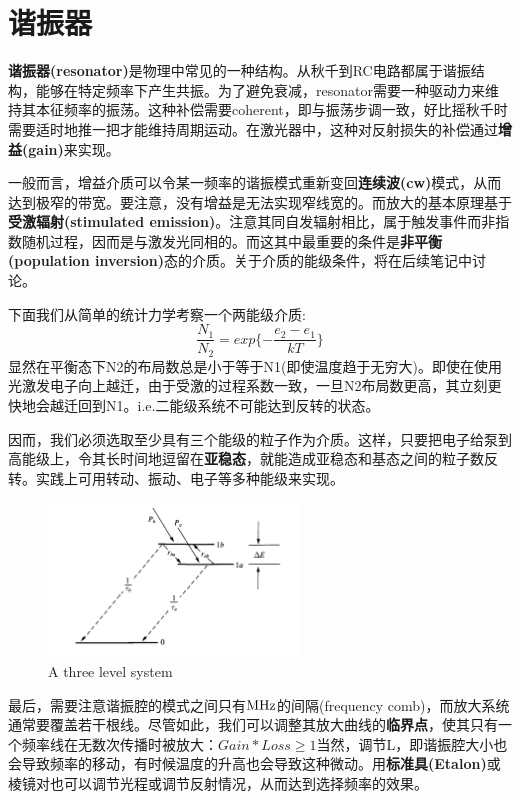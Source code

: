 \documentclass[12pt]{ctexart}%
\begin{document}
\section*{谐振器}
\textbf{谐振器(resonator)}是物理中常见的一种结构。从秋千到RC电路都属于谐振结构，能够在特定频率下产生共振。为了避免衰减，resonator需要一种驱动力来维持其本征频率的振荡。这种补偿需要coherent，即与振荡步调一致，好比摇秋千时需要适时地推一把才能维持周期运动。在激光器中，这种对反射损失的补偿通过\textbf{增益(gain)}来实现。
\par 一般而言，增益介质可以令某一频率的谐振模式重新变回\textbf{连续波(cw)}模式，从而达到极窄的带宽。要注意，没有增益是无法实现窄线宽的。而放大的基本原理基于\textbf{受激辐射(stimulated emission)}。注意其同自发辐射相比，属于触发事件而非指数随机过程，因而是与激发光同相的。而这其中最重要的条件是\textbf{非平衡(population inversion)}态的介质。关于介质的能级条件，将在后续笔记中讨论。
\par 下面我们从简单的统计力学考察一个两能级介质:
\begin{equation}
    \frac{N_1}{N_2}=exp\{-\frac{e_2-e_1}{kT}\}
\end{equation}
显然在平衡态下N2的布局数总是小于等于N1(即使温度趋于无穷大)。即使在使用光激发电子向上越迁，由于受激的过程系数一致，一旦N2布局数更高，其立刻更快地会越迁回到N1。i.e.二能级系统不可能达到反转的状态。
\par 因而，我们必须选取至少具有三个能级的粒子作为介质。这样，只要把电子给泵到高能级上，令其长时间地逗留在\textbf{亚稳态}，就能造成亚稳态和基态之间的粒子数反转。实践上可用转动、振动、电子等多种能级来实现。
\begin{figure}[t] 
    \centering
    \includegraphics[width=0.6\textwidth]{energy_level.png}
    \caption{A three level system}
    \label{three level system}
\end{figure}
\par 最后，需要注意谐振腔的模式之间只有$\textup{MHz}$的间隔(frequency comb)，而放大系统通常要覆盖若干根线。尽管如此，我们可以调整其放大曲线的\textbf{临界点}，使其只有一个频率线在无数次传播时被放大：$ Gain * Loss\geq 1$当然，调节L，即谐振腔大小也会导致频率的移动，有时候温度的升高也会导致这种微动。用\textbf{标准具(Etalon)}或棱镜对也可以调节光程或调节反射情况，从而达到选择频率的效果。
\end{document}
